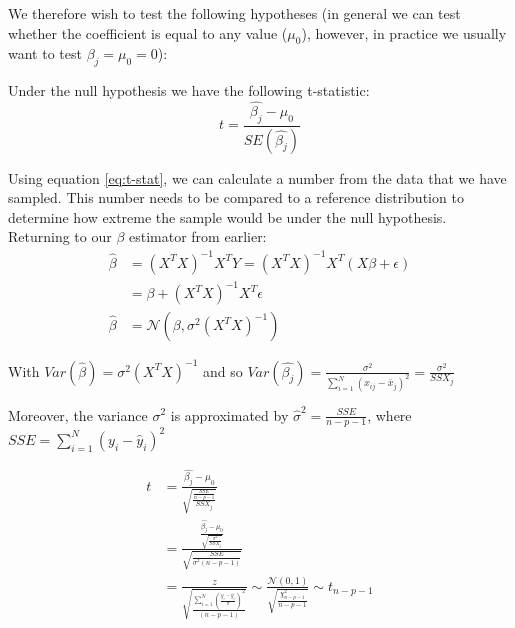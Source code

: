 \documentclass{article}
\begin{document}
We therefore wish to test the following hypotheses (in general we can test whether the coefficient is equal to any value ($\mu_0$), however, in practice we usually want to test $\beta_j=\mu_0=0$):

\noindent{}

Under the null hypothesis we have the following t-statistic:
\begin{equation}\label{eq:t-stat}
t = \frac{\hat{\beta_j} - \mu_0}{SE(\hat{\beta_j})}
\end{equation}

Using equation \ref{eq:t-stat}, we can calculate a number from the data that we have sampled. This number needs to be compared to a reference distribution to determine how extreme the sample would be under the null hypothesis. Returning to our $\beta$ estimator from earlier:
\begin{align*}
\hat{\beta} &= (X^T X)^{-1} X^TY = (X^TX)^{-1}X^T(X\beta + \epsilon)\\
&= \beta + (X^T X)^{-1}X^T\epsilon\\
\hat{\beta} &= \mathcal{N}(\beta, \sigma^2 (X^TX)^{-1})
\end{align*}

With $Var(\hat{\beta}) = \sigma^2 (X^TX)^{-1}$ and so $Var(\hat{\beta_j}) =  \frac{\sigma^2}{\sum\limits_{i=1}^N (x_{ij} - \bar{x}_j)^2} = \frac{\sigma^2}{SSX_j}$

Moreover, the variance $\sigma^2$ is approximated by $\hat{\sigma}^2 = \frac{SSE}{n-p-1}$, where $SSE = \sum\limits_{i=1}^{N}(y_i - \hat{y}_i)^2$

\begin{align*}
t &= \frac{\hat{\beta_j} - \mu_0}{\sqrt{\frac{\frac{SSE}{n-p-1}}{SSX_j}}}\\
&= \frac{\frac{\hat{\beta_j} - \mu_0}{\sqrt{\frac{\sigma^2}{SSX_j}}}}{\sqrt{\frac{SSE}{\sigma^2(n-p-1)}}}\\
&= \frac{z}{\sqrt{\frac{\sum\limits_{i=1}^{N}(\frac{y_i - \hat{y}_i}{\sigma})^2}{(n-p-1)}}} \sim \frac{\mathcal{N}(0,1)}{\sqrt{\frac{\chi^2_{n-p-1}}{n-p-1}}} \sim t_{n-p-1}
\end{align*}
\end{document}
